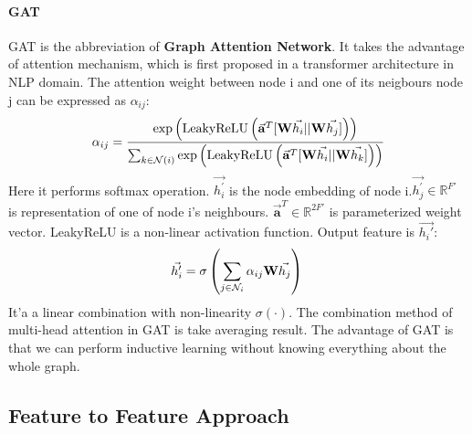 \documentclass[sigconf]{acmart}
\begin{document}
\paragraph{GAT} GAT is the abbreviation of \textbf{Graph Attention Network}\cite{velivckovic2017graph}. It takes the advantage of attention mechanism, which is first proposed in a transformer architecture in NLP domain. The attention weight between node i and one of its neigbours node j can be expressed as $\alpha_{ij}$: 
\begin{equation}
\setlength\abovedisplayskip{5pt}%
\setlength\belowdisplayskip{5pt}
\alpha_{ij} = \frac{\textup{exp}\left(\textup{LeakyReLU}\left(\vec{\mathbf{a}}^{T}[\mathbf{W}\vec{h_{i}}||\mathbf{W}\vec{h_{j}}]\right)\right)}{\sum_{k \in \mathcal N\left(i\right)}\textup{exp}\left(\textup{LeakyReLU}\left(\vec{\mathbf{a}}^{T}[\mathbf{W}\vec{ h_{i}}||\mathbf{W} \vec{h_{k}}]\right)\right)}\\
\end{equation}
Here it performs softmax operation. $\vec{h_{i}^{'}}$ is the node embedding of node i.$\vec{h_{j}^{'}} \in \mathbb{R}^{F'}$
is representation of one of node i's neighbours. $\vec{\mathbf{a}}^{T} \in \mathbb{R}^{2F'}$ is parameterized weight vector. LeakyReLU is a non-linear activation function. Output feature is $\vec{h_{i}'}$:
\begin{equation}
\setlength\abovedisplayskip{5pt}%
\setlength\belowdisplayskip{5pt}
\vec{h_{i}'} = \sigma\left(\sum_{j \in \mathcal N_{i}}\alpha_{ij}\mathbf{W}\vec{h_{j}}\right)\\
\end{equation}
It'a a linear combination with non-linearity $\sigma(\cdot)$. The combination method of multi-head attention in GAT is take averaging result. The advantage of GAT is that we can perform inductive learning without knowing everything about the whole graph.

\subsection{Feature to Feature Approach}
\end{document}
